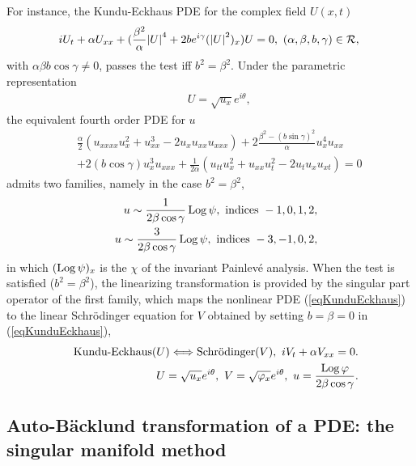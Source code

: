 \documentclass[10pt]{article}
\begin{document}
For instance, the Kundu-Eckhaus PDE
for the complex field $U(x,t)$ \cite{Kundu1984,CE1987}
\begin{eqnarray}
{\hskip -3.0 truemm}
& &
 i U_t + \alpha U_{xx}
+(\frac{\beta^2}{\alpha}{\mod{U}}^4 +2 b e^{i \gamma}({\mod{U}}^2)_x)U=0,\
(\alpha, \beta, b, \gamma) \in {\mathcal R},\
\label{eqKunduEckhaus}
\end{eqnarray}
with $\alpha \beta b \cos \gamma \not=0$,
passes the test iff \cite{CC1987,CMGalli1993} $b^2=\beta^2$.
Under the parametric representation 
\begin{eqnarray}
& &
U=\sqrt{u_x} e^{i \theta},
\end{eqnarray}
the equivalent fourth order PDE for $u$ \cite{CMGalli1993}
\begin{eqnarray}
& &
 \frac{\alpha}{2} (u_{xxxx} u_x^2 + u_{xx}^3 - 2 u_x u_{xx} u_{xxx})
+ 2 \frac{\beta^2 - (b \sin \gamma)^2}{\alpha} u_x^4 u_{xx}
\nonumber
\\
& &
+ 2 (b \cos \gamma) u_x^3 u_{xxx}
+\frac{1}{2 \alpha} (u_{tt} u_x^2 + u_{xx} u_t^2 - 2 u_t u_x u_{xt})
=0
\end{eqnarray}
admits two families, namely in the case $b^2=\beta^2$,
\begin{eqnarray}
& &
u \sim \frac{1}{2 \beta \cos \gamma} \mathop{\rm Log}\nolimits \psi,\ \hbox{indices } -1,0,1,2,
\\
& &
u \sim \frac{3}{2 \beta \cos \gamma} \mathop{\rm Log}\nolimits \psi,\ \hbox{indices } -3,-1,0,2,
\end{eqnarray}
in which $(\mathop{\rm Log}\nolimits \psi)_x$ is the $\chi$ of the invariant Painlev\'e analysis.
When the test is satisfied ($b^2=\beta^2$),
the linearizing transformation \cite{Kundu1984}
is provided by \cite{CMGalli1993}
the singular part operator of the first family,
which maps the nonlinear PDE
(\ref{eqKunduEckhaus})
to the linear Schr\"odinger equation for $V$
obtained by setting $b=\beta=0$ in (\ref{eqKunduEckhaus}),
\begin{eqnarray}
& &
\hbox{Kundu-Eckhaus}(U)
\Longleftrightarrow
\hbox{Schr\"odinger}(V),\
 i V_t + \alpha V_{xx} = 0.
\\
& &
U=\sqrt{u_x} e^{i \theta},\
V=\sqrt{\varphi_x} e^{i \theta},\
u = \frac{\mathop{\rm Log}\nolimits \varphi}{2 \beta \cos \gamma}.
\end{eqnarray}

\subsection{Auto-B\"acklund transformation of a PDE:
            the singular manifold method}
\label{sectionBT}
\end{document}
